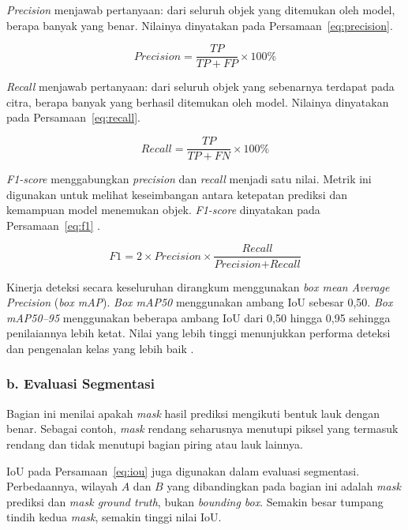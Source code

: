 \textit{Precision} menjawab pertanyaan: dari seluruh objek yang ditemukan oleh model, berapa banyak yang benar. Nilainya dinyatakan pada Persamaan~\ref{eq:precision}.

\begin{equation}
    \textit{Precision} = \frac{TP}{TP + FP}\times 100\%
    \label{eq:precision}
\end{equation}

\textit{Recall} menjawab pertanyaan: dari seluruh objek yang sebenarnya terdapat pada citra, berapa banyak yang berhasil ditemukan oleh model. Nilainya dinyatakan pada Persamaan~\ref{eq:recall}.

\begin{equation}
    \textit{Recall} = \frac{TP}{TP + FN}\times 100\%
    \label{eq:recall}
\end{equation}

\textit{F1-score} menggabungkan \textit{precision} dan \textit{recall} menjadi satu nilai. Metrik ini digunakan untuk melihat keseimbangan antara ketepatan prediksi dan kemampuan model menemukan objek. \textit{F1-score} dinyatakan pada Persamaan~\ref{eq:f1} \cite{yue2023}.

\begin{equation}
    F1 = 2 \times {\textit{Precision}} \times
    \frac{\textit{Recall}}
         {\textit{Precision} + \textit{Recall}}
    \label{eq:f1}
\end{equation}

Kinerja deteksi secara keseluruhan dirangkum menggunakan \textit{box mean Average Precision} (\textit{box mAP}). \textit{Box mAP50} menggunakan ambang IoU sebesar 0,50. \textit{Box mAP50--95} menggunakan beberapa ambang IoU dari 0,50 hingga 0,95 sehingga penilaiannya lebih ketat. Nilai yang lebih tinggi menunjukkan performa deteksi dan pengenalan kelas yang lebih baik \cite{qiu2025,syafira2025}.

\subsubsection*{b. Evaluasi Segmentasi}

Bagian ini menilai apakah \textit{mask} hasil prediksi mengikuti bentuk lauk dengan benar. Sebagai contoh, \textit{mask} rendang seharusnya menutupi piksel yang termasuk rendang dan tidak menutupi bagian piring atau lauk lainnya.

IoU pada Persamaan~\ref{eq:iou} juga digunakan dalam evaluasi segmentasi. Perbedaannya, wilayah $A$ dan $B$ yang dibandingkan pada bagian ini adalah \textit{mask} prediksi dan \textit{mask ground truth}, bukan \textit{bounding box}. Semakin besar tumpang tindih kedua \textit{mask}, semakin tinggi nilai IoU.

